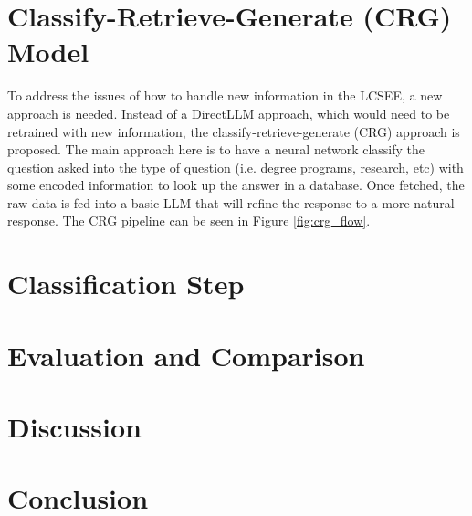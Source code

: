 \documentclass[conference]{IEEEtran}
\begin{document}
\section{Classify-Retrieve-Generate (CRG) Model}
To address the issues of how to handle new information in the LCSEE, a new approach is needed. 
Instead of a DirectLLM approach, which would need to be retrained with new information, the classify-retrieve-generate (CRG) approach is proposed. 
The main approach here is to have a neural network classify the question asked into the type of question (i.e. degree programs, research, etc) with some encoded information to look up the answer in a database. 
Once fetched, the raw data is fed into a basic LLM that will refine the response to a more natural response.
The CRG pipeline can be seen in Figure \ref{fig:crg_flow}.

\section{Classification Step}

\section{Evaluation and Comparison}


\section{Discussion}


\section{Conclusion}
\end{document}
